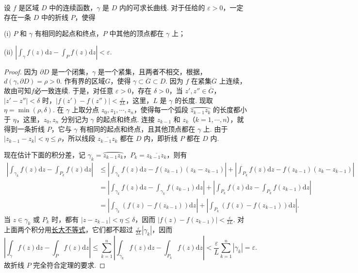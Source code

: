 \documentclass[../../main.tex]{subfiles}%
\begin{document}
\begin{lemma}\label{lemma:引理:3.2.2}
设 \( f \) 是区域 \( D \) 中的连续函数，\( \gamma \) 是 \( D \) 内的可求长曲线. 对于任给的 \( \varepsilon > 0 \)，一定存在一条 \( D \) 中的折线 \( P \)，使得

(i) \( P \) 和 \( \gamma \) 有相同的起点和终点，\( P \) 中其他的顶点都在 \( \gamma \) 上；

(ii) \( \left| \int_\gamma f(z)\mathrm{d}z - \int_P f(z)\mathrm{d}z \right| < \varepsilon \).
\end{lemma}
\begin{proof}

因为 \( \partial D \) 是一个闭集，\( \gamma \) 是一个紧集，且两者不相交，根据，\( d(\gamma, \partial D) = \rho > 0 \). 作有界的区域\( G \)，使得 \( \gamma \subset \overline{G} \subset D \). 因为 \( f \) 在紧集\( \overline{G} \) 上连续，故由可知$f$必一致连续. 于是，对任意 \( \varepsilon > 0 \)，存在 \( \delta > 0 \)，当 \( z', z'' \in \overline{G} \)，\( |z' - z''| < \delta \) 时，\( |f(z') - f(z'')| < \frac{\varepsilon}{2L} \)，这里，\( L \) 是 \( \gamma \) 的长度. 现取 \( \eta = \min(\rho, \delta) \). 在 \( \gamma \) 上取分点 \( z_0, z_1, \cdots, z_n \)，使得每一个弧段 \( \wideparen{z_{k - 1}z_k} \) 的长度都小于 \( \eta \)，这里，\( z_0, z_n \) 分别记为 \( \gamma \) 的起点和终点. 连接 \( z_{k - 1} \) 和 \( z_k \)（\( k = 1, \cdots, n \)），就得到一条折线 \( P \)，它与 \( \gamma \) 有相同的起点和终点，且其他顶点都在 \( \gamma \) 上. 由于 \( |z_{k - 1} - z_k| < \eta \leqslant \rho \)，所以线段 \( \overline{z_{k - 1}z_k} \) 都在 \( D \) 内，即折线 \( P \) 都在 \( D \) 内.

现在估计下面的积分差，记 \( \gamma_k = \wideparen{z_{k - 1}z_k} \)，\( P_k = \overline{z_{k - 1}z_k} \)，则有
\begin{align*}
\left| \int_{\gamma_k} f(z)\mathrm{d}z - \int_{P_k} f(z)\mathrm{d}z \right|
&\leqslant \left| \int_{\gamma_k} f(z)\mathrm{d}z - f(z_{k - 1})(z_k - z_{k - 1}) \right|
+ \left| \int_{P_k} f(z)\mathrm{d}z - f(z_{k - 1})(z_k - z_{k - 1}) \right|
\\
&= \left| \int_{\gamma_k} f(z)\mathrm{d}z - \int_{\gamma_k} f(z_{k - 1})\mathrm{d}z \right| + \left| \int_{P_k} f(z)\mathrm{d}z - \int_{P_k} f(z_{k - 1})\mathrm{d}z \right|
\\
&= \left| \int_{\gamma_k} (f(z) - f(z_{k - 1}))\mathrm{d}z \right| + \left| \int_{P_k} (f(z) - f(z_{k - 1}))\mathrm{d}z \right|.
\end{align*}
当 \( z \in \gamma_k \) 或 \( P_k \) 时，都有 \( |z - z_{k - 1}| < \eta \leqslant \delta \)，因而 \( |f(z) - f(z_{k - 1})| < \frac{\varepsilon}{2L} \). 对上面两个积分用\hyperref[theorem:长大不等式]{长大不等式}，它们都不超过 \( \frac{\varepsilon}{2L}|\gamma_k| \)，因而
\[
\left| \int_\gamma f(z)\mathrm{d}z - \int_P f(z)\mathrm{d}z \right| \leqslant \sum_{k = 1}^n \left| \int_{\gamma_k} f(z)\mathrm{d}z - \int_{P_k} f(z)\mathrm{d}z \right|
< \frac{\varepsilon}{L} \sum_{k = 1}^n |\gamma_k|
= \varepsilon.
\]
故折线 \( P \) 完全符合定理的要求.

\end{proof}
\end{document}
